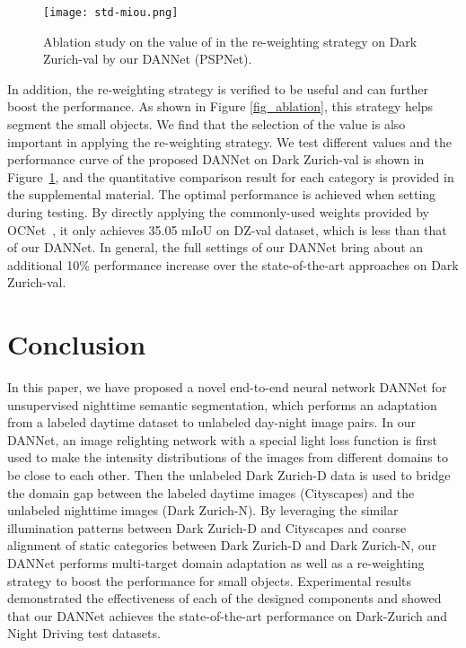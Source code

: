 \documentclass[final]{cvpr}
\begin{document}
\begin{figure}[h]\small
	\begin{center}
		\texttt{[image: std-miou.png]}
		\vspace{1pt}
		\caption{Ablation study on the value of  in the re-weighting strategy on Dark Zurich-val by our DANNet (PSPNet).}
		\label{rw_ablation}
	\end{center}
	\vspace{-18pt}
\end{figure}

In addition, the re-weighting strategy is verified to be useful and can further boost the performance. 
As shown in Figure \ref{fig_ablation}, this strategy helps segment the small objects.  
We find that the selection of the value  is also important in applying the re-weighting strategy.
We test different  values and the performance curve of the proposed DANNet on Dark Zurich-val is shown in Figure~\ref{rw_ablation}, and the quantitative comparison result for each category is provided in the supplemental material. 
The optimal performance is achieved when setting  during testing.   By directly applying the commonly-used weights provided by OCNet~\cite{YuanW18}, it only achieves 35.05 mIoU on DZ-val dataset, which is less than that of our DANNet.
In general, the full settings of our DANNet bring about an additional 10\% performance increase over the state-of-the-art approaches on Dark Zurich-val. 

\section{Conclusion}
In this paper, we have proposed a novel end-to-end neural network DANNet for unsupervised nighttime semantic segmentation, which performs an adaptation from a labeled daytime dataset to unlabeled day-night image pairs. 
In our DANNet, an image relighting network with a special light loss function is first used to make the intensity distributions of the images from different domains to be close to each other. Then the unlabeled Dark Zurich-D data is used to bridge the domain gap between the labeled daytime images (Cityscapes) and the unlabeled nighttime images (Dark Zurich-N). By leveraging the similar illumination patterns between Dark Zurich-D and Cityscapes and coarse alignment of static categories between Dark Zurich-D and Dark Zurich-N, our DANNet performs multi-target domain adaptation as well as a re-weighting strategy to boost the performance for small objects. Experimental results demonstrated  the effectiveness of each of the designed components and showed that our DANNet achieves the state-of-the-art performance on Dark-Zurich and Night Driving test datasets. 

{\small
	
	
}
\end{document}
